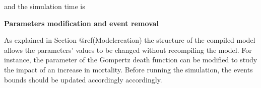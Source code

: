 \begin{Shaded}
\begin{Highlighting}[]
\OperatorTok{$}\NormalTok{logs[}\NormalTok{]}\OperatorTok{/}\OperatorTok{$}\NormalTok{logs[}\NormalTok{]}
\end{Highlighting}
\end{Shaded}

and the simulation time is

\begin{Shaded}
\begin{Highlighting}[]
\OperatorTok{$}\NormalTok{logs[}\NormalTok{]}
\end{Highlighting}
\end{Shaded}

\textbf{Parameters modification and event removal}

As explained in Section @ref(Modelcreation) the structure of the compiled model allows the parameters' values to be changed without recompiling the model. For instance, the parameter of the Gompertz death function can be modified to study the impact of an increase in mortality.
Before running the simulation, the events bounds should be updated accordingly accordingly.

\begin{Shaded}
\begin{Highlighting}[]
\OperatorTok{$}\StringTok{ }\NormalTok{(}\NormalTok{,}\NormalTok{) }

\NormalTok{events\_bounds[}\NormalTok{] \textless{}{-}}\StringTok{ }\OperatorTok{*}\NormalTok{(}\OperatorTok{*}

\StringTok{ }
 \NormalTok{) }
\end{Highlighting}
\end{Shaded}

